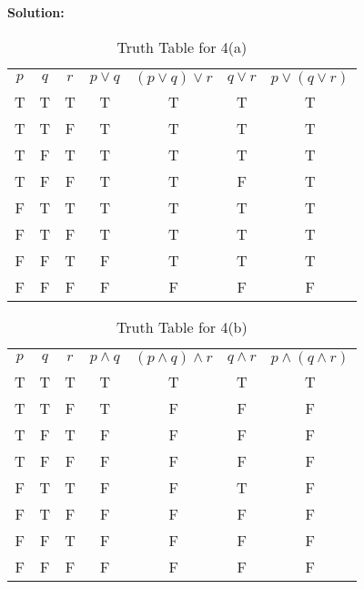 \documentclass{Axon}
\begin{document}
\noindent
\textbf{Solution:}

\begin{table}[ht]
    \centering
    \begin{tabular}{c|c|c|c|c|c|c}
        \(p\) & \(q\) & \(r\) & \(p \lor q\) & \((p \lor q) \lor r\) & \(q \lor r\) & \(p \lor (q \lor r)\) \\
        T     & T     & T     & T            & T                     & T            & T                     \\
        T     & T     & F     & T            & T                     & T            & T                     \\
        T     & F     & T     & T            & T                     & T            & T                     \\
        T     & F     & F     & T            & T                     & F            & T                     \\
        F     & T     & T     & T            & T                     & T            & T                     \\
        F     & T     & F     & T            & T                     & T            & T                     \\
        F     & F     & T     & F            & T                     & T            & T                     \\
        F     & F     & F     & F            & F                     & F            & F
    \end{tabular}
    \caption{Truth Table for 4(a)}
\end{table}

\begin{table}[ht]
    \centering
    \begin{tabular}{c|c|c|c|c|c|c}
        \(p\) & \(q\) & \(r\) & \(p \land q\) & \((p \land q) \land r\) & \(q \land r\) & \(p \land (q \land r)\) \\
        T     & T     & T     & T             & T                       & T             & T                       \\
        T     & T     & F     & T             & F                       & F             & F                       \\
        T     & F     & T     & F             & F                       & F             & F                       \\
        T     & F     & F     & F             & F                       & F             & F                       \\
        F     & T     & T     & F             & F                       & T             & F                       \\
        F     & T     & F     & F             & F                       & F             & F                       \\
        F     & F     & T     & F             & F                       & F             & F                       \\
        F     & F     & F     & F             & F                       & F             & F
    \end{tabular}
    \caption{Truth Table for 4(b)}
\end{table}
\end{document}
